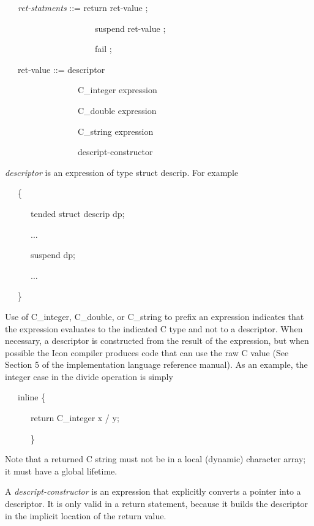 {\ttfamily\mdseries
\ \ \ \textit{ret-statments} ::= return ret-value ; {\textbar}}

{\ttfamily\mdseries
\ \ \ \ \ \ \ \ \ \ \ \ \ \ \ \ \ \ \ \ \ suspend ret-value ; {\textbar}}

{\ttfamily\mdseries
\ \ \ \ \ \ \ \ \ \ \ \ \ \ \ \ \ \ \ \ \ fail ;}

{\ttfamily\mdseries
\ \ \ ret-value ::= descriptor {\textbar}}

{\ttfamily\mdseries
\ \ \ \ \ \ \ \ \ \ \ \ \ \ \ \ \ C\_integer expression {\textbar}}

{\ttfamily\mdseries
\ \ \ \ \ \ \ \ \ \ \ \ \ \ \ \ \ C\_double expression {\textbar}}

{\ttfamily\mdseries
\ \ \ \ \ \ \ \ \ \ \ \ \ \ \ \ \ C\_string expression {\textbar}}

{\ttfamily\mdseries
\ \ \ \ \ \ \ \ \ \ \ \ \ \ \ \ \ descript-constructor}


\textit{descriptor} is an expression of type struct descrip. For example 

{\ttfamily\mdseries
\ \ \ \{}

{\ttfamily\mdseries
\ \ \ \ \ \ tended struct descrip dp;}

{\ttfamily\mdseries
\ \ \ \ \ \ ...}

{\ttfamily\mdseries
\ \ \ \ \ \ suspend dp;}

{\ttfamily\mdseries
\ \ \ \ \ \ ...}

{\ttfamily\mdseries
\ \ \ \}}


Use of C\_integer, C\_double, or C\_string to prefix an expression
indicates that the expression evaluates to the indicated C type and
not to a descriptor. When necessary, a descriptor is constructed from
the result of the expression, but when possible the Icon compiler
produces code that can use the raw C value (See Section 5 of the
implementation language reference manual). As an example, the integer
case in the divide operation is simply

{\ttfamily\mdseries
\ \ \ inline \{}

{\ttfamily\mdseries
\ \ \ \ \ \ return C\_integer x / y;}

{\ttfamily\mdseries
\ \ \ \ \ \ \}}


Note that a returned C string must not be in a local (dynamic)
character array; it must have a global lifetime.

A \textit{descript-constructor} is an expression that explicitly
converts a pointer into a descriptor. It is only valid in a return
statement, because it builds the descriptor in the implicit location
of the return value.

